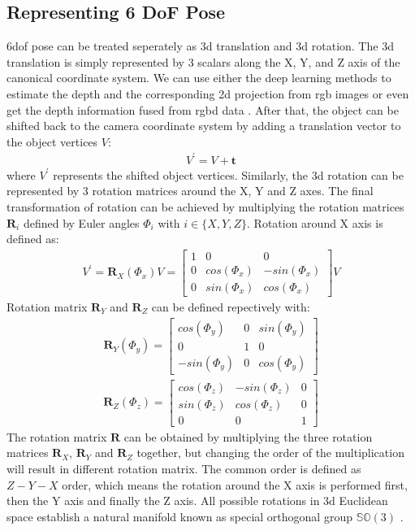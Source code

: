 \documentclass[12pt,DIV14,BCOR12mm,a4paper,footinclude=false,headinclude,parskip=half-,twoside,openright,cleardoublepage=empty,toc=index,bibliography=totoc,listof=totoc]{scrreprt}
\numberwithin{equation}{chapter}
\begin{document}
\subsection{Representing 6 DoF Pose}\label{sec:representation}
\gls{6dof} pose can be treated seperately as \gls{3d} translation and \gls{3d} rotation. The \gls{3d} translation is simply represented by 3 scalars along the X, Y, and Z axis of the canonical coordinate system. 
We can use either the deep learning methods to estimate the depth and the corresponding \gls{2d} projection from \gls{rgb} images or even get the depth information fused from \gls{rgbd} data \cite{DBLP:journals/corr/abs-1711-00199}. After that, the object can be shifted back to the camera coordinate system by adding a translation vector to the object vertices $V$:
\begin{align}
  V^{'} = V + \mathbf{t}
\end{align}
where $V^{'}$ represents the shifted object vertices. Similarly, the \gls{3d} rotation can be represented by 3 rotation matrices around the X, Y and Z axes. The final transformation of rotation can be achieved by multiplying the rotation matrices $\mathbf{R}_{i}$ defined by Euler angles $\Phi_{i}$ with $i\in \{X,Y,Z\}$. Rotation around X axis is defined as:
\begin{align}
  V^{'} = \mathbf{R}_{X}(\Phi_{x})V = \begin{bmatrix}
    1 & 0 & 0 \\
    0 & cos(\Phi_{x}) & -sin(\Phi_{x}) \\
    0 & sin(\Phi_{x}) & cos(\Phi_{x})
  \end{bmatrix}V
\end{align}
Rotation matrix $\mathbf{R}_{Y}$ and $\mathbf{R}_{Z}$ can be defined repectively with:
\begin{align}
  \mathbf{R}_{Y}(\Phi_{y}) = \begin{bmatrix}
    cos(\Phi_{y}) & 0 & sin(\Phi_{y}) \\
    0 & 1 & 0 \\
    -sin(\Phi_{y}) & 0 & cos(\Phi_{y})
  \end{bmatrix}
\end{align}
\begin{align}
  \mathbf{R}_{Z}(\Phi_{z}) = \begin{bmatrix}
    cos(\Phi_{z}) & -sin(\Phi_{z}) & 0 \\
    sin(\Phi_{z}) & cos(\Phi_{z}) & 0 \\
    0 & 0 & 1
  \end{bmatrix}
\end{align}
The rotation matrix $\mathbf{R}$ can be obtained by multiplying the three rotation matrices $\mathbf{R}_{X}$, $\mathbf{R}_{Y}$ and $\mathbf{R}_{Z}$ together, but changing the order of the multiplication will result in different rotation matrix. The common order is defined as $Z-Y-X$ order, which means the rotation around the X axis is performed first, then the Y axis and finally the Z axis. All possible rotations in \gls{3d} Euclidean space establish a natural manifold known as special orthogonal group $\mathbb{S} \mathbb{O} (3)$ \cite{hashim2019special}.
\end{document}
